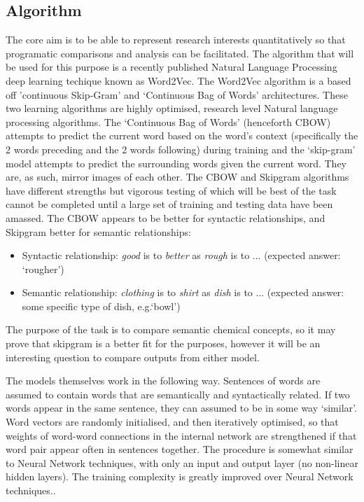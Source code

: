 \documentclass[11pt, oneside]{article}   	%
\begin{document}
\subsection{Algorithm}
The core aim is to be able to represent research interests quantitatively so that programatic comparisons and analysis can be facilitated. The algorithm that will be used for this purpose is a recently published Natural Language Processing deep learning techique known as Word2Vec\cite{WORD2VEC}\cite{PHRASE2VEC}. The Word2Vec algorithm is a based off  'continuous Skip-Gram' and `Continuous Bag of Words' architectures. These two learning algorithms are highly optimised, research level Natural language processing algorithms. The `Continuous Bag of Words' (henceforth CBOW) attempts to predict the current word based on the word's context (specifically the 2 words preceding and the 2 words following) during training and the `skip-gram' model attempts to predict the surrounding words given the current word. They are, as such, mirror images of each other. The CBOW and Skipgram algorithms have different strengths but vigorous testing of which will be best of the task cannot be completed until a large set of training and testing data have been amassed. The CBOW appears to be better for syntactic relationships, and Skipgram better for semantic relationships\cite{WORD2VEC}:
\begin{itemize}
\item Syntactic relationship: \emph{good} is to \emph{better} as \emph{rough} is to ... (expected answer: `rougher')  \cite{LINGUISTICREG}
\item Semantic relationship: \emph{clothing} is to \emph{shirt} as \emph{dish} is to ... (expected answer: some specific type of dish, e.g.`bowl')  \cite{LINGUISTICREG}
\end{itemize}
The purpose of the task is to compare semantic chemical concepts, so it may prove that skipgram is a better fit for the purposes, however it will be an interesting question to compare outputs from either model.

The models themselves work in the following way. Sentences of words are assumed to contain words that are semantically and syntactically related. If two words appear in the same sentence, they can assumed to be in some way `similar'. Word vectors are randomly initialised, and then iteratively optimised, so that weights of word-word connections in the internal network are strengthened if that word pair appear often in sentences together. The procedure is somewhat similar to Neural Network techniques, with only an input and output layer (no non-linear hidden layers). The training complexity is greatly improved over Neural Network techniques.\cite{WORD2VEC}.
\end{document}
